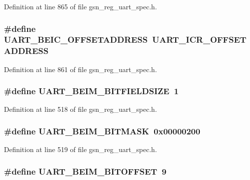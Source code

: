 Definition at line 865 of file gsn\_\-reg\_\-uart\_\-spec.h.

\hypertarget{a00575_aa6db7d4e3bda5820d59533a1f7f82073}{
\subsubsection[{UART\_\-BEIC\_\-OFFSETADDRESS}]{\setlength{\rightskip}{0pt plus 5cm}\#define UART\_\-BEIC\_\-OFFSETADDRESS~UART\_\-ICR\_\-OFFSETADDRESS}}
\label{a00575_aa6db7d4e3bda5820d59533a1f7f82073}


Definition at line 861 of file gsn\_\-reg\_\-uart\_\-spec.h.

\hypertarget{a00575_a5859af68ecc75ca1352e67a418b97efc}{
\subsubsection[{UART\_\-BEIM\_\-BITFIELDSIZE}]{\setlength{\rightskip}{0pt plus 5cm}\#define UART\_\-BEIM\_\-BITFIELDSIZE~1}}
\label{a00575_a5859af68ecc75ca1352e67a418b97efc}


Definition at line 518 of file gsn\_\-reg\_\-uart\_\-spec.h.

\hypertarget{a00575_ad1abfd46de6077edefa3d9115c179e46}{
\subsubsection[{UART\_\-BEIM\_\-BITMASK}]{\setlength{\rightskip}{0pt plus 5cm}\#define UART\_\-BEIM\_\-BITMASK~0x00000200}}
\label{a00575_ad1abfd46de6077edefa3d9115c179e46}


Definition at line 519 of file gsn\_\-reg\_\-uart\_\-spec.h.

\hypertarget{a00575_ad494f4a3befc5ab1620393c8a0eb557f}{
\subsubsection[{UART\_\-BEIM\_\-BITOFFSET}]{\setlength{\rightskip}{0pt plus 5cm}\#define UART\_\-BEIM\_\-BITOFFSET~9}}
\label{a00575_ad494f4a3befc5ab1620393c8a0eb557f}


